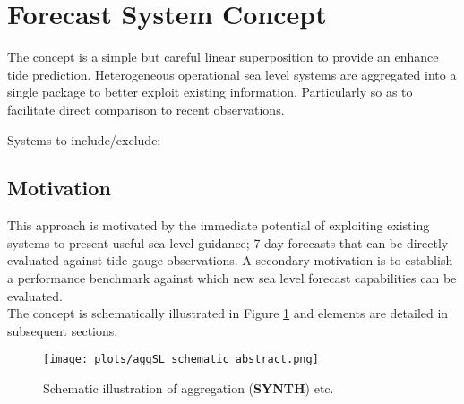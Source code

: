 \section{Forecast System Concept}

The concept is a simple but careful linear superposition to provide an enhance tide prediction.
Heterogeneous operational sea level systems are aggregated into a single package to better exploit existing information.
Particularly so as to facilitate direct comparison to recent observations.

Systems to include/exclude:\\


\subsection{Motivation}
This approach is motivated by the immediate potential of exploiting existing systems to present useful sea level guidance;  7-day forecasts that can be directly evaluated against tide gauge observations.
A secondary motivation is to establish a performance benchmark against which new sea level forecast capabilities can be evaluated. \\

 


The concept is schematically illustrated in Figure \ref{fig:aggSL} and elements are detailed in subsequent sections.  

\begin{figure}[H]
\centering
\texttt{[image: plots/aggSL\_schematic\_abstract.png]}
\caption{Schematic illustration of aggregation (\textbf{SYNTH}) etc. }
\label{fig:aggSL}
\end{figure}   




